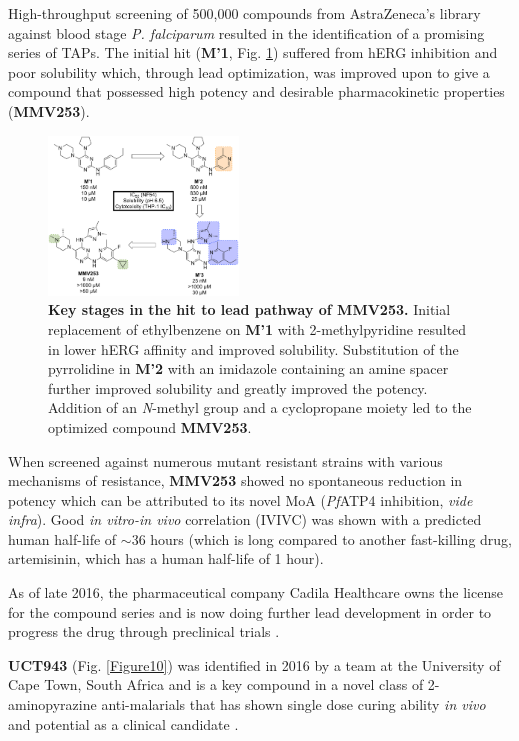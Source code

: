 \documentclass[twocolumn]{bmcart}%
\begin{document}
High-throughput screening of 500,000 compounds from AstraZeneca's library against blood stage \textit{P. falciparum} resulted in the identification of a promising series of TAPs. The initial hit (\textbf{M'1}, Fig. \ref{Figure9}) suffered from hERG inhibition and poor solubility which, through lead optimization, was improved upon to give a compound that possessed high potency and desirable pharmacokinetic properties (\textbf{MMV253}).

\begin{figure}[h]
	\includegraphics [width=0.45\textwidth] {Figure9}
	\caption{{\bf Key stages in the hit to lead pathway of MMV253.} Initial replacement of ethylbenzene on \textbf{M'1} with 2-methylpyridine resulted in lower hERG affinity and improved solubility.  Substitution of the pyrrolidine in \textbf{M'2} with an imidazole containing an amine spacer further improved solubility and greatly improved the potency. Addition of an \textit{N}-methyl group and a cyclopropane moiety led to the optimized compound \textbf{MMV253}.}
	\label{Figure9}
\end{figure}

When screened against numerous mutant resistant strains with various mechanisms of resistance, \textbf{MMV253} showed no spontaneous reduction in potency which can be attributed to its novel MoA (\textit{Pf}ATP4 inhibition, \textit{vide infra}). Good \textit{in vitro-in vivo} correlation (IVIVC) was shown with a predicted human half-life of $\sim$36 hours (which is long compared to another fast-killing drug, artemisinin, which has a human half-life of 1 hour).

As of late 2016, the pharmaceutical company Cadila Healthcare owns the license for the compound series and is now doing further lead development in order to progress the drug through preclinical trials \cite{Zydus}.

\hrulefill

\textbf{UCT943} (Fig. \ref{Figure10}) was identified in 2016 by a team at the University of Cape Town, South Africa and is a key compound in a novel class of 2-aminopyrazine anti-malarials that has shown single dose curing ability \textit{in vivo} and potential as a clinical candidate \cite{Manach2016}.
\end{document}
